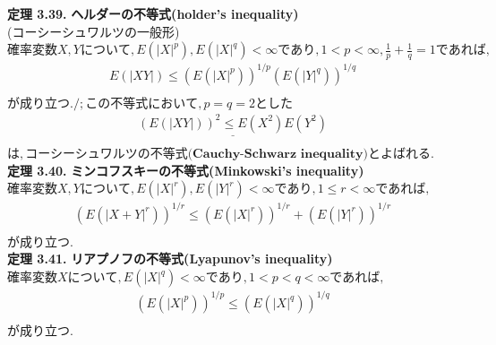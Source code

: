 \documentclass[dvipdfmx,10pt, a4j]{jarticle}
\theoremstyle{definition}
\begin{document}
\noindent
\textbf{定理 3.39.} \textbf{ヘルダーの不等式(holder's inequality)}\\
(コーシーシュワルツの一般形)\\
$確率変数X, Y について, E(|X|^p), E(|X|^q) < \infty であり, 1 < p < \infty, \frac{1}{p} + \frac{1}{q} = 1 であれば,$\\
\begin{align*}
    E(|XY|) \leq (E(|X|^p))^{1/p} (E(|Y|^q))^{1/q} \\
\end{align*}
$が成り立つ./; この不等式において, p = q = 2とした$\\
\begin{align*}
    \underline{(E(|XY|))^2 \leq E(X^2)E(Y^2)} \\
\end{align*}
$は, \textbf{コーシーシュワルツの不等式(Cauchy-Schwarz inequality)} とよばれる.$\\

\noindent
\textbf{定理 3.40.} \textbf{ミンコフスキーの不等式(Minkowski's inequality)}\\
$確率変数X, Yについて, E(|X|^r), E(|Y|^r) < \infty　であり, 1 \leq r < \infty であれば,$\\
\begin{align*}
    (E(|X + Y|^r))^{1/r} \leq (E(|X|^r))^{1/r} + (E(|Y|^r))^{1/r} \\
\end{align*}
が成り立つ.\\

\noindent
\textbf{定理 3.41.} \textbf{リアプノフの不等式(Lyapunov's inequality)}\\
$確率変数Xについて, E(|X|^q) < \infty であり, 1 < p < q < \infty であれば,$\\
\begin{align*}
    (E(|X|^p))^{1/p} \leq (E(|X|^q))^{1/q} \\
\end{align*}
が成り立つ.\\
\end{document}
